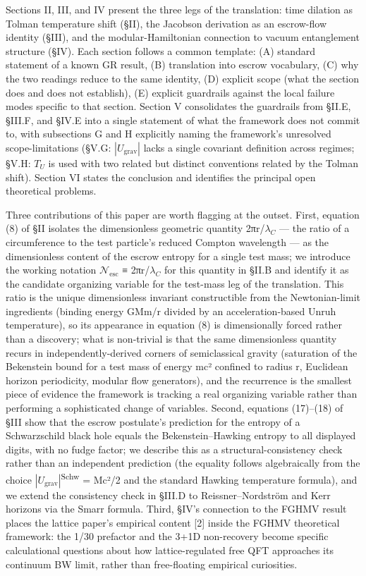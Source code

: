 \documentclass[11pt]{article}
\begin{document}
Sections II, III, and IV present the three legs of the translation: time
dilation as Tolman temperature shift (§II), the Jacobson derivation as
an escrow-flow identity (§III), and the modular-Hamiltonian connection
to vacuum entanglement structure (§IV). Each section follows a common
template: (A) standard statement of a known GR result, (B) translation
into escrow vocabulary, (C) why the two readings reduce to the same
identity, (D) explicit scope (what the section does and does not
establish), (E) explicit guardrails against the local failure modes
specific to that section. Section V consolidates the guardrails from
§II.E, §III.F, and §IV.E into a single statement of what the framework
does not commit to, with subsections G and H explicitly naming the
framework's unresolved scope-limitations (§V.G: $|U_{\mathrm{grav}}|$ lacks a
single covariant definition across regimes; §V.H: $T_{U}$ is used with two
related but distinct conventions related by the Tolman shift). Section
VI states the conclusion and identifies the principal open theoretical
problems.

Three contributions of this paper are worth flagging at the outset.
First, equation (8) of §II isolates the dimensionless geometric quantity
2πr/$\lambda_{C}$ --- the ratio of a circumference to the test particle's reduced
Compton wavelength --- as the dimensionless content of the escrow
entropy for a single test mass; we introduce the working notation $\mathcal{N}_{\mathrm{esc}}$
≡ 2πr/$\lambda_{C}$ for this quantity in §II.B and identify it as the candidate
organizing variable for the test-mass leg of the translation. This ratio
is the unique dimensionless invariant constructible from the
Newtonian-limit ingredients (binding energy GMm/r divided by an
acceleration-based Unruh temperature), so its appearance in equation (8)
is dimensionally forced rather than a discovery; what is non-trivial is
that the same dimensionless quantity recurs in independently-derived
corners of semiclassical gravity (saturation of the Bekenstein bound for
a test mass of energy mc² confined to radius r, Euclidean horizon
periodicity, modular flow generators), and the recurrence is the
smallest piece of evidence the framework is tracking a real organizing
variable rather than performing a sophisticated change of variables.
Second, equations (17)--(18) of §III show that the escrow postulate's
prediction for the entropy of a Schwarzschild black hole equals the
Bekenstein--Hawking entropy to all displayed digits, with no fudge
factor; we describe this as a structural-consistency check rather than
an independent prediction (the equality follows algebraically from the
choice $|U_{\mathrm{grav}}|$\textsuperscript{Schw} = Mc²/2 and the standard Hawking temperature
formula), and we extend the consistency check in §III.D to
Reissner--Nordström and Kerr horizons via the Smarr formula. Third,
§IV's connection to the FGHMV result places the lattice paper's
empirical content [2] inside the FGHMV theoretical framework: the 1/30
prefactor and the 3+1D non-recovery become specific calculational
questions about how lattice-regulated free QFT approaches its continuum
BW limit, rather than free-floating empirical curiosities.
\end{document}
